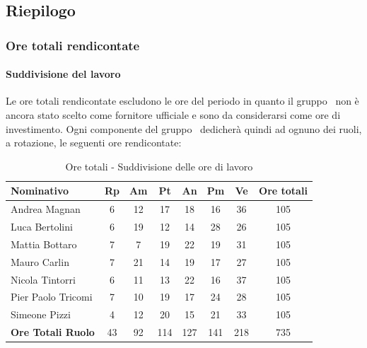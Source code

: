 \documentclass[./PianoDiProgetto.tex]{subfiles}
\begin{document}
\vspace{35mm}

	\subsection{Riepilogo}
			\subsubsection{Ore totali rendicontate}
				\paragraph{Suddivisione del lavoro}
					Le ore totali rendicontate escludono le ore del periodo \PerAR{} in quanto il gruppo \GRUPPO\ non è ancora stato scelto come fornitore ufficiale e sono da considerarsi come ore di investimento. Ogni componente del gruppo \GRUPPO\ dedicherà quindi ad ognuno dei ruoli, a rotazione, le seguenti ore rendicontate:

	\begin{table}[H]
		\begin{tabularx}{\textwidth}{l  * {6}{c}  c}
			\toprule
			\textbf{Nominativo} & \textbf{Rp} & \textbf{Am} & \textbf{Pt}
						& \textbf{An} & \textbf{Pm} & \textbf{Ve} & \textbf{Ore totali} \\
			\midrule
			Andrea Magnan  & 6  & 12 & 17 & 18 & 16  & 36 & 105 \\
			Luca Bertolini  & 6 & 19 & 12 & 14 & 28 & 26 & 105 \\
			Mattia Bottaro  & 7  & 7 & 19 & 22 & 19  & 31 & 105 \\
			Mauro Carlin  & 7 & 21 & 14 & 19 & 17 & 27 & 105 \\
			Nicola Tintorri  & 6 & 11 & 13 & 22 & 16 & 37 & 105 \\
			Pier Paolo Tricomi  & 7 & 10 & 19 & 17 & 24 & 28 & 105 \\
			Simeone Pizzi & 4 & 12 & 20 & 15 & 21 & 33 & 105 \\
			\midrule
			\textbf{Ore Totali Ruolo} & 43    & 92   & 114   & 127   & 141 & 218   & 735 \\
			\bottomrule
		\end{tabularx}
		\caption{Ore totali - Suddivisione delle ore di lavoro}
	\end{table}


\vfill
\end{document}

